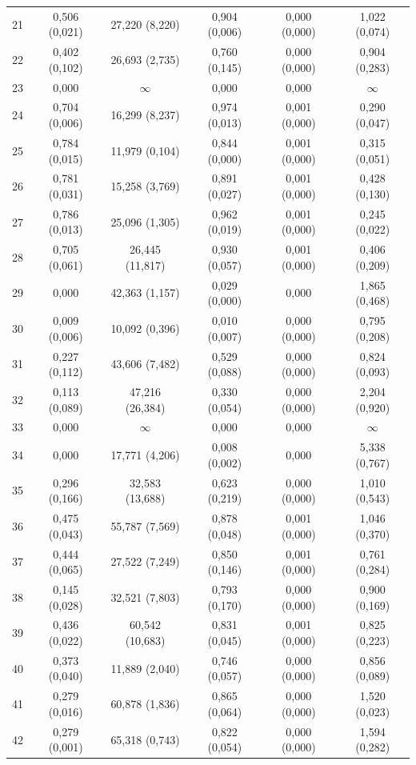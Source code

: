 \begin{tabular}{l c c c c c}
21 & 0,506 (0,021) & 27,220 (8,220) & 0,904 (0,006) & 0,000 (0,000) & 1,022 (0,074) \\
22 & 0,402 (0,102) & 26,693 (2,735) & 0,760 (0,145) & 0,000 (0,000) & 0,904 (0,283) \\
23 & 0,000 & $\infty$ & 0,000 & 0,000 & $\infty$ \\
24 & 0,704 (0,006) & 16,299 (8,237) & 0,974 (0,013) & 0,001 (0,000) & 0,290 (0,047) \\
25 & 0,784 (0,015) & 11,979 (0,104) & 0,844 (0,000) & 0,001 (0,000) & 0,315 (0,051) \\
26 & 0,781 (0,031) & 15,258 (3,769) & 0,891 (0,027) & 0,001 (0,000) & 0,428 (0,130) \\
27 & 0,786 (0,013) & 25,096 (1,305) & 0,962 (0,019) & 0,001 (0,000) & 0,245 (0,022) \\
28 & 0,705 (0,061) & 26,445 (11,817) & 0,930 (0,057) & 0,001 (0,000) & 0,406 (0,209) \\
29 & 0,000 & 42,363 (1,157) & 0,029 (0,000) & 0,000 & 1,865 (0,468) \\
30 & 0,009 (0,006) & 10,092 (0,396) & 0,010 (0,007) & 0,000 (0,000) & 0,795 (0,208) \\
31 & 0,227 (0,112) & 43,606 (7,482) & 0,529 (0,088) & 0,000 (0,000) & 0,824 (0,093) \\
32 & 0,113 (0,089) & 47,216 (26,384) & 0,330 (0,054) & 0,000 (0,000) & 2,204 (0,920) \\
33 & 0,000 & $\infty$ & 0,000 & 0,000 & $\infty$ \\
34 & 0,000 & 17,771 (4,206) & 0,008 (0,002) & 0,000 & 5,338 (0,767) \\
35 & 0,296 (0,166) & 32,583 (13,688) & 0,623 (0,219) & 0,000 (0,000) & 1,010 (0,543) \\
36 & 0,475 (0,043) & 55,787 (7,569) & 0,878 (0,048) & 0,001 (0,000) & 1,046 (0,370) \\
37 & 0,444 (0,065) & 27,522 (7,249) & 0,850 (0,146) & 0,001 (0,000) & 0,761 (0,284) \\
38 & 0,145 (0,028) & 32,521 (7,803) & 0,793 (0,170) & 0,000 (0,000) & 0,900 (0,169) \\
39 & 0,436 (0,022) & 60,542 (10,683) & 0,831 (0,045) & 0,001 (0,000) & 0,825 (0,223) \\
40 & 0,373 (0,040) & 11,889 (2,040) & 0,746 (0,057) & 0,000 (0,000) & 0,856 (0,089) \\
41 & 0,279 (0,016) & 60,878 (1,836) & 0,865 (0,064) & 0,000 (0,000) & 1,520 (0,023) \\
42 & 0,279 (0,001) & 65,318 (0,743) & 0,822 (0,054) & 0,000 (0,000) & 1,594 (0,282) \\

\end{tabular}
